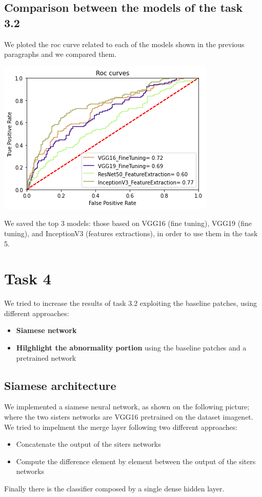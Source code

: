 \documentclass{article}
\begin{document}
\subsection{Comparison between the models of the task 3.2}
We ploted the roc curve related to each of the models shown in the previous paragraphs and we compared them.
\begin{center}
\begin{minipage}{0.45\textwidth}
        \includegraphics[scale=0.6]{./img/rocPretrain3_2.png}
    \end{minipage}
\end{center}
We saved the top 3 models: those based on VGG16 (fine tuning), VGG19 (fine tuning), and InceptionV3 (features extractions), in order to use them in the task 5.




\clearpage
\section{Task 4}
We tried to increase the results of task 3.2 exploiting the baseline patches, using different approaches:
\begin{itemize}
\item \textbf{Siamese network}
\item \textbf{Hilghlight the abnormality portion} using the baseline patches and a pretrained network
\end{itemize}

\subsection{Siamese architecture}
We implemented a siamese neural network, as shown on the following picture; where the two sisters networks are VGG16 pretrained on the dataset imagenet.\\
We tried to impelment the merge layer following two different approaches:
\begin{itemize}
\item Concatenate the output of the siters networks
\item Compute the difference element by element between the output of the siters networks
\end{itemize}
Finally there is the classifier composed by a single dense hidden layer.\\
\end{document}
